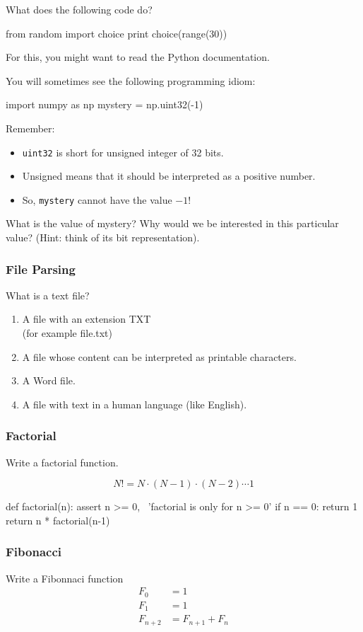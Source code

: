 \begin{frame}[fragile]
{}
What does the following code do?

\begin{python}
from random import choice
print choice(range(30))
\end{python}

For this, you might want to read the Python documentation.
\end{frame}

\begin{frame}[fragile]
{}
You will sometimes see the following programming idiom:

\begin{python}
import numpy as np
mystery = np.uint32(-1)
\end{python}

Remember:
\begin{itemize}
\item \lstinline{uint32} is short for \alert{unsigned integer of 32 bits}.
\item Unsigned means that it should be interpreted as a positive number.
\item So, \lstinline{mystery} cannot have the value $-1$!
\end{itemize}

What is the value of mystery? Why would we be interested in this particular
value? (Hint: think of its bit representation).

\end{frame}

\begin{frame}[fragile]
\frametitle{File Parsing}

What is a text file?

\begin{enumerate}
\item A file with an extension TXT\\
    (for example file.txt)
\item A file whose content can be interpreted as printable characters.
\item A Word file.
\item A file with text in a human language (like English).
\end{enumerate}
\end{frame}

\begin{frame}[fragile]
\frametitle{Factorial}
Write a factorial function.

\[
N! = N \cdot (N - 1) \cdot (N - 2) \cdots 1
\]

\pause

\begin{python}
def factorial(n):
    assert n >= 0, \
        'factorial is only for n >= 0'
    if n == 0: return 1
    return n * factorial(n-1)
\end{python}

\end{frame}

\begin{frame}[fragile]
\frametitle{Fibonacci}

Write a Fibonnaci function
\begin{align*}
F_0 &= 1\\
F_1 &= 1\\
F_{n+2} &= F_{n+1} + F_n
\end{align*}
\end{frame}


